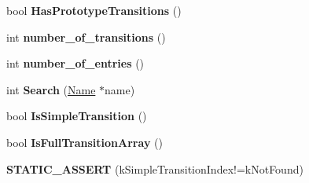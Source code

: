 \begin{DoxyCompactItemize}
\item 
\hypertarget{classv8_1_1internal_1_1_transition_array_a60cda26d8a93728ff533ddd300ddc4d1}{}bool {\bfseries Has\+Prototype\+Transitions} ()\label{classv8_1_1internal_1_1_transition_array_a60cda26d8a93728ff533ddd300ddc4d1}

\item 
\hypertarget{classv8_1_1internal_1_1_transition_array_a1c94a46302490f0b106bf8e955ddb7b4}{}int {\bfseries number\+\_\+of\+\_\+transitions} ()\label{classv8_1_1internal_1_1_transition_array_a1c94a46302490f0b106bf8e955ddb7b4}

\item 
\hypertarget{classv8_1_1internal_1_1_transition_array_a14afd3974aa93e0c774fc941315528f6}{}int {\bfseries number\+\_\+of\+\_\+entries} ()\label{classv8_1_1internal_1_1_transition_array_a14afd3974aa93e0c774fc941315528f6}

\item 
\hypertarget{classv8_1_1internal_1_1_transition_array_a01f12084f5380ad412438b925659ff2e}{}int {\bfseries Search} (\hyperlink{classv8_1_1internal_1_1_name}{Name} $\ast$name)\label{classv8_1_1internal_1_1_transition_array_a01f12084f5380ad412438b925659ff2e}

\item 
\hypertarget{classv8_1_1internal_1_1_transition_array_af389a1da8a7d04202e572d45202234c2}{}bool {\bfseries Is\+Simple\+Transition} ()\label{classv8_1_1internal_1_1_transition_array_af389a1da8a7d04202e572d45202234c2}

\item 
\hypertarget{classv8_1_1internal_1_1_transition_array_ab15418fcd40bfab9a0972727f0a169f3}{}bool {\bfseries Is\+Full\+Transition\+Array} ()\label{classv8_1_1internal_1_1_transition_array_ab15418fcd40bfab9a0972727f0a169f3}

\item 
\hypertarget{classv8_1_1internal_1_1_transition_array_aab6d027d7207bc22316a92d7ba321c6b}{}{\bfseries S\+T\+A\+T\+I\+C\+\_\+\+A\+S\+S\+E\+R\+T} (k\+Simple\+Transition\+Index!=k\+Not\+Found)\label{classv8_1_1internal_1_1_transition_array_aab6d027d7207bc22316a92d7ba321c6b}

\end{DoxyCompactItemize}
